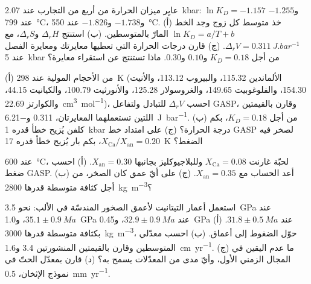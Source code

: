 \begin{exercise}[$\star\star$]\label{exo:b2:pt-paths:5}
عايِر ميزان الحرارة من أربع من التجارب عند \qty{2.07}{kbar}: $\ln K_D =
-1.157$ و$-1.255$ عند \qty{799}{\celsius}، و$-1.738$ و$-1.826$ عند \qty{550}{\celsius}.
(أ) خذ متوسط كل زوج وجد الخط $\ln K_D = a/T + b$ المارّ بالمتوسطين.
(ب) استنتج $\Delta_r H$ و$\Delta_r S$، مع $\Delta_r V = \qty{0.311}{J.bar^{-1}}$.
(ج) قارن درجات الحرارة التي تعطيها معايرتك ومعايرة الفصل عند
\qty{5}{kbar} من أجل $K_D = 0.18$ و$0.10$ و$0.30$. ماذا تستنتج عن
استقراء معايرة؟
\end{exercise}

\begin{exercise}[$\star\star$]\label{exo:b2:pt-paths:6}
(أ) من الأحجام المولية عند \qty{298}{K} (الألماندين 115.32، والبيروب 113.12، والأنيت
154.30، والفلوغوبيت 149.65، والغروسولار 125.28، والأنورثيت 100.79، والكيانيت 44.15، والكوارتز
\qty{22.69}{cm^3.mol^{-1}})، احسب $\Delta_r V$ للتبادل ولتفاعل
GASP، وقارن بالقيمتين اللتين تستعملهما المعايرتان، \num{0.311}
و\qty{-6.21}{J.bar^{-1}}. (ب) من أجل $K_D = 0.18$، بكم كلفن يُزيح خطأ قدره
\qty{1}{kbar} درجة الحرارة؟ (ج) على امتداد خط GASP لصخر فيه
$X_{\text{Ca}}/X_{\text{an}} = 0.20$، بكم بار يُزيح خطأ قدره \qty{17}{K}
الضغط؟
\end{exercise}

\begin{exercise}[$\star\star$]\label{exo:b2:pt-paths:7}
عند \qty{600}{\celsius}، لحبّة غارنت $X_{\text{Ca}} = 0.08$ وللبلاجيوكليز بجانبها
$X_{\text{an}} = 0.30$. (أ) احسب ضغط GASP. (ب) أعد الحساب مع $X_{\text{an}} =
0.35$. (ج) على أيّ عمق كان الصخر، من أجل كثافة متوسطة قدرها \qty{2800}{kg.m^{-3}}؟
\end{exercise}

\begin{exercise}[$\star\star$]\label{exo:b2:pt-paths:8}
استعمل أعمار التيتانيت لأعمق الصخور المندسّة في الألب: نحو \qty{3.5}{GPa} عند
$35.1 \pm \qty{0.9}{Ma}$، و\qty{1.0}{GPa} عند $32.9 \pm \qty{0.9}{Ma}$، و\qty{0.45}{GPa} عند
$31.8 \pm \qty{0.5}{Ma}$. (أ) بكثافة متوسطة قدرها \qty{3000}{kg.m^{-3}}، حوّل
الضغوط إلى أعماق. (ب) احسب معدّلي  المتوسطين وقارن بالقيمتين
المنشورتين 3.4 و\qty{1.6}{cm.yr^{-1}}. (ج) ما عدم اليقين في المجال الزمني
الأول، وأيّ مدى من المعدّلات يسمح به؟ (د) قارن بمعدّل الحتّ في
نموذج الإثخان، \qty{0.5}{mm.yr^{-1}}.
\end{exercise}

